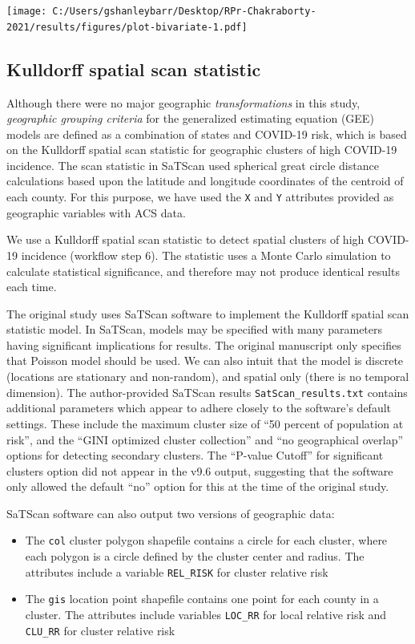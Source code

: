 \documentclass[
]{article}
\providecommand{\tightlist}{%
  \setlength{\itemsep}{0pt}\setlength{\parskip}{0pt}}
\begin{document}
\texttt{[image: C:/Users/gshanleybarr/Desktop/RPr-Chakraborty-2021/results/figures/plot-bivariate-1.pdf]}

\hypertarget{kulldorff-spatial-scan-statistic}{%
\subsection{Kulldorff spatial scan
statistic}\label{kulldorff-spatial-scan-statistic}}

Although there were no major geographic \emph{transformations} in this
study, \emph{geographic grouping criteria} for the generalized
estimating equation (GEE) models are defined as a combination of states
and COVID-19 risk, which is based on the Kulldorff spatial scan
statistic for geographic clusters of high COVID-19 incidence. The scan
statistic in SaTScan used spherical great circle distance calculations
based upon the latitude and longitude coordinates of the centroid of
each county. For this purpose, we have used the \texttt{X} and
\texttt{Y} attributes provided as geographic variables with ACS data.

We use a Kulldorff spatial scan statistic to detect spatial clusters of
high COVID-19 incidence (workflow step 6). The statistic uses a Monte
Carlo simulation to calculate statistical significance, and therefore
may not produce identical results each time.

The original study uses SaTScan software to implement the Kulldorff
spatial scan statistic model. In SaTScan, models may be specified with
many parameters having significant implications for results. The
original manuscript only specifies that Poisson model should be used. We
can also intuit that the model is discrete (locations are stationary and
non-random), and spatial only (there is no temporal dimension). The
author-provided SaTScan results \texttt{SatScan\_results.txt} contains
additional parameters which appear to adhere closely to the software's
default settings. These include the maximum cluster size of ``50 percent
of population at risk'', and the ``GINI optimized cluster collection''
and ``no geographical overlap'' options for detecting secondary
clusters. The ``P-value Cutoff'' for significant clusters option did not
appear in the v9.6 output, suggesting that the software only allowed the
default ``no'' option for this at the time of the original study.

SaTScan software can also output two versions of geographic data:

\begin{itemize}
\tightlist
\item
  The \texttt{col} cluster polygon shapefile contains a circle for each
  cluster, where each polygon is a circle defined by the cluster center
  and radius. The attributes include a variable \texttt{REL\_RISK} for
  cluster relative risk
\item
  The \texttt{gis} location point shapefile contains one point for each
  county in a cluster. The attributes include variables \texttt{LOC\_RR}
  for local relative risk and \texttt{CLU\_RR} for cluster relative risk
\end{itemize}
\end{document}
